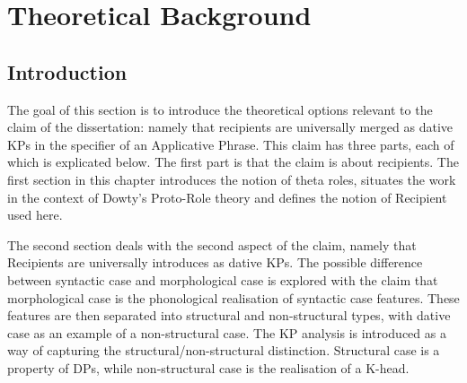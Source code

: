 \chapter{Theoretical Background}
\section{Introduction}
The goal of this section is to introduce the theoretical options relevant to the claim of the dissertation: namely that recipients are universally merged as dative KPs in the specifier of an Applicative Phrase. This claim has three parts, each of which is explicated below. The first part is that the claim is about recipients. The first section in this chapter introduces the notion of theta roles, situates the work in the context of Dowty's Proto-Role theory and defines the notion of Recipient used here.

The second section deals with the second aspect of the claim, namely that Recipients are universally introduces as dative KPs. The possible difference between syntactic case and morphological case is explored with the claim that morphological case is the phonological realisation of syntactic case features. These features are then separated into structural and non-structural types, with dative case as an example of a non-structural case. The KP analysis is introduced as a way of capturing the structural/non-structural distinction. Structural case is a property of DPs, while non-structural case is the realisation of a K-head.

